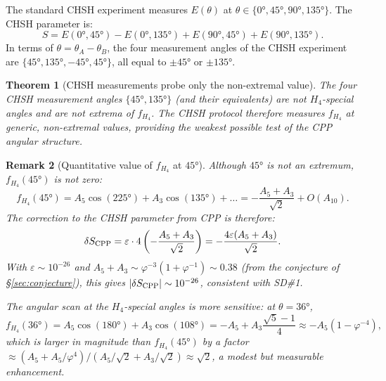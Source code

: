 \documentclass[11pt,letterpaper]{article}
\newtheorem{theorem}{Theorem}[section]
\newtheorem{remark}[theorem]{Remark}
\newcommand{\phig}{\varphi}
\newcommand{\eps}{\varepsilon}
\begin{document}
The standard CHSH experiment measures $E(\theta)$ at
$\theta \in \{0°, 45°, 90°, 135°\}$.  The CHSH parameter is:
\begin{equation}
S = E(0°,45°) - E(0°,135°) + E(90°,45°) + E(90°,135°).
\label{eq:CHSH}
\end{equation}
In terms of $\theta = \theta_A - \theta_B$, the four measurement
angles of the CHSH experiment are $\{45°, 135°, -45°, 45°\}$, all
equal to $\pm45°$ or $\pm135°$.

\begin{theorem}[CHSH measurements probe only the non-extremal value]
\label{thm:blind_spot}
The four CHSH measurement angles $\{45°, 135°\}$ (and their
equivalents) are not $H_4$-special angles and are not extrema of
$f_{H_4}$.  The CHSH protocol therefore measures $f_{H_4}$ at
generic, non-extremal values, providing the weakest possible
test of the CPP angular structure.
\end{theorem}

\begin{remark}[Quantitative value of $f_{H_4}$ at $45°$]
Although $45°$ is not an extremum, $f_{H_4}(45°)$ is not zero:
\begin{equation}
f_{H_4}(45°)
= A_5\cos(225°) + A_3\cos(135°) + \ldots
= -\frac{A_5 + A_3}{\sqrt{2}} + O(A_{10}).
\label{eq:f45}
\end{equation}
The correction to the CHSH parameter from CPP is therefore:
\begin{equation}
\delta S_{\rm CPP}
= \eps \cdot 4\left(-\frac{A_5 + A_3}{\sqrt{2}}\right)
= -\frac{4\eps(A_5 + A_3)}{\sqrt{2}}.
\label{eq:deltaS_CHSH}
\end{equation}
With $\eps \sim 10^{-26}$ and $A_5 + A_3 \sim \phig^{-3}(1 +
\phig^{-1}) \sim 0.38$ (from the conjecture of
\S\ref{sec:conjecture}), this gives $|\delta S_{\rm CPP}|
\sim 10^{-26}$, consistent with SD\#1.

The \emph{angular scan} at the $H_4$-special angles is more
sensitive: at $\theta = 36°$,
\begin{equation}
f_{H_4}(36°)
= A_5\cos(180°) + A_3\cos(108°)
= -A_5 + A_3\frac{\sqrt5-1}{4}
\approx -A_5(1 - \phig^{-4}),
\label{eq:f36}
\end{equation}
which is \emph{larger in magnitude} than $f_{H_4}(45°)$ by a factor
$\approx (A_5 + A_5/\phig^4)/(A_5/\sqrt2 + A_3/\sqrt2) \approx
\sqrt2$, a modest but measurable enhancement.
\end{remark}

\end{document}
